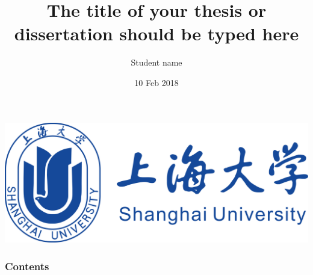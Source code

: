 \documentclass[compress,serif,11pt]{beamer}
\title[{\sc The short title of your thesis } \hspace{0.8cm} \insertframenumber/\inserttotalframenumber]{{\sc The title of your thesis or dissertation should be typed here }}
\author[Presentation to some students --- {\sc Feb 10\superscript{th}, 2018}]{{Student name}}
\date{10 Feb 2018}
\institute{Department of Mathematics \\ Shanghai University}
\begin{document}
\begin{frame}
  \begin{center}
    \vspace{-0.1cm}
    \includegraphics[scale=0.14]{shu_logo.jpg}
  \end{center}
  \titlepage
\end{frame}

\begin{frame}
\frametitle{Contents}
\begin{multicols}{2}
  \tableofcontents
\end{multicols}
\end{frame}

















\end{document}
